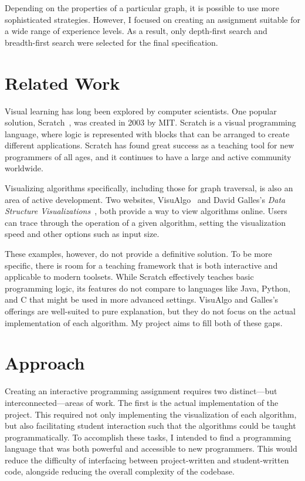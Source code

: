 \documentclass[pageno]{jpaper}
\begin{document}
Depending on the properties of a particular graph, it is possible to use more sophisticated strategies. However, I focused on creating an assignment suitable for a wide range of experience levels. As a result, only depth-first search and breadth-first search were selected for the final specification.

\section{Related Work}

Visual learning has long been explored by computer scientists. One popular solution, Scratch~\cite{scratch}, was created in 2003 by MIT. Scratch is a visual programming language, where logic is represented with blocks that can be arranged to create different applications. Scratch has found great success as a teaching tool for new programmers of all ages, and it continues to have a large and active community worldwide. 

Visualizing algorithms specifically, including those for graph traversal, is also an area of active development. Two websites, VisuAlgo~\cite{visualgo} and David Galles's \emph{Data Structure Visualizations}~\cite{usf}, both provide a way to view algorithms online. Users can trace through the operation of a given algorithm, setting the visualization speed and other options such as input size.

These examples, however, do not provide a definitive solution. To be more specific, there is room for a teaching framework that is both interactive and applicable to modern toolsets. While Scratch effectively teaches basic programming logic, its features do not compare to languages like Java, Python, and C that might be used in more advanced settings. VisuAlgo and Galles's offerings are well-suited to pure explanation, but they do not focus on the actual implementation of each algorithm. My project aims to fill both of these gaps.

\section{Approach}

Creating an interactive programming assignment requires two distinct—but interconnected—areas of work. The first is the actual implementation of the project. This required not only implementing the visualization of each algorithm, but also facilitating student interaction such that the algorithms could be taught programmatically. To accomplish these tasks, I intended to find a programming language that was both powerful and accessible to new programmers. This would reduce the difficulty of interfacing between project-written and student-written code, alongside reducing the overall complexity of the codebase.
\end{document}
